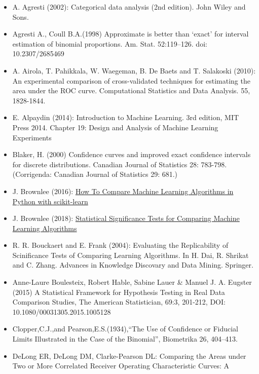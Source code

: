\documentclass[
  letterpaper,
  DIV=11,
  numbers=noendperiod]{scrartcl}
\providecommand{\tightlist}{%
  \setlength{\itemsep}{0pt}\setlength{\parskip}{0pt}}\usepackage{longtable,booktabs,array}
\begin{document}
\begin{itemize}
\tightlist
\item
  A. Agresti (2002): Categorical data analysis (2nd edition). John Wiley
  and Sons.
\item
  Agresti A., Coull B.A.(1998) Approximate is better than `exact' for
  interval estimation of binomial proportions. Am. Stat. 52:119--126.
  doi: 10.2307/2685469
\item
  A. Airola, T. Pahikkala, W. Waegeman, B. De Baets and T. Salakoski
  (2010): An experimental comparison of cross-validated techniques for
  estimating the area under the ROC curve. Computational Statistics and
  Data Analysis. 55, 1828-1844.
\item
  E. Alpaydin (2014): Introduction to Machine Learning. 3rd edition, MIT
  Press 2014. Chapter 19: Design and Analysis of Machine Learning
  Experiments
\item
  Blaker, H. (2000) Confidence curves and improved exact confidence
  intervals for discrete distributions. Canadian Journal of Statistics
  28: 783-798. (Corrigenda: Canadian Journal of Statistics 29: 681.)
\item
  J. Brownlee (2016):
  \href{https://machinelearningmastery.com/compare-machine-learning-algorithms-python-scikit-learn/}{How
  To Compare Machine Learning Algorithms in Python with scikit-learn}
\item
  J. Brownlee (2018):
  \href{https://machinelearningmastery.com/statistical-significance-tests-for-comparing-machine-learning-algorithms/}{Statistical
  Significance Tests for Comparing Machine Learning Algorithms}
\item
  R. R. Bouckaert and E. Frank (2004): Evaluating the Replicability of
  Scinificance Tests of Comparing Learning Algorithms. In H. Dai, R.
  Shrikat and C. Zhang. Advances in Knowledge Discovary and Data Mining.
  Springer.
\item
  Anne-Laure Boulesteix, Robert Hable, Sabine Lauer \& Manuel J. A.
  Eugster (2015) A Statistical Framework for Hypothesis Testing in Real
  Data Comparison Studies, The American Statistician, 69:3, 201-212,
  DOI: 10.1080/00031305.2015.1005128
\item
  Clopper,C.J.,and Pearson,E.S.(1934),``The Use of Confidence or
  Fiducial Limits Illustrated in the Case of the Binomial'', Biometrika
  26, 404--413.
\item
  DeLong ER, DeLong DM, Clarke-Pearson DL: Comparing the Areas under Two
  or More Correlated Receiver Operating Characteristic Curves: A

\end{itemize}
\end{document}

